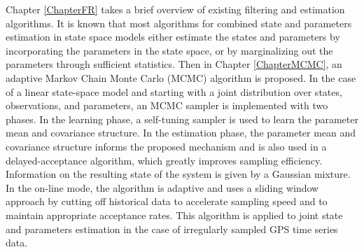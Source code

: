 Chapter \ref{ChapterFR} takes a brief overview of existing filtering and estimation algorithms. It is known that most algorithms for combined state and parameters estimation in state space models either estimate the states and parameters by incorporating the parameters in the state space, or by marginalizing out the parameters through sufficient statistics. Then in Chapter \ref{ChapterMCMC}, an adaptive Markov Chain Monte Carlo (MCMC) algorithm is proposed. In the case of a linear state-space model and starting with a joint distribution over states, observations, and parameters, an MCMC sampler is implemented with two phases. In the learning phase, a self-tuning sampler is used to learn the parameter mean and covariance structure. In the estimation phase, the parameter mean and covariance structure informs the proposed mechanism and is also used in a delayed-acceptance algorithm, which greatly improves sampling efficiency. Information on the resulting state of the system is given by a Gaussian mixture. In the on-line mode, the algorithm is adaptive and uses a sliding window approach by cutting off historical data to accelerate sampling speed and to maintain appropriate acceptance rates. This algorithm is applied to joint state and parameters estimation in the case of irregularly sampled GPS time series data. 
